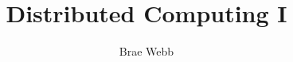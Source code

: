 \documentclass{csse4400}
\title{Distributed Computing I}
\author{Brae Webb}
\date{\week{5}}
\begin{document}
\makecover





\end{document}
